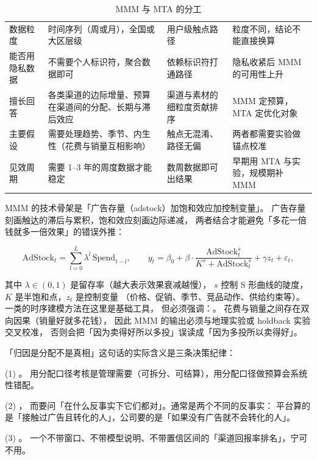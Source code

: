 \begin{table}[htbp]
\centering
\caption{MMM 与 MTA 的分工}
\label{tab:growth-mmm-mta}
\small
\begin{tabularx}{\textwidth}{L{2.1cm} L{3.5cm} L{3.5cm} Y}
\toprule
{} &  &  &  \\
\midrule
数据粒度 & 时间序列（周或月），全国或大区层级 & 用户级触点路径 & 粒度不同，结论不能直接换算 \\
\addlinespace
能否用隐私数据 & 不需要个人标识符，聚合数据即可 & 依赖标识符打通路径 & 隐私收紧后 MMM 的可用性上升 \\
\addlinespace
擅长回答 & 各类渠道的边际增量、预算在渠道间的分配、长期与滞后效应 & 渠道与素材的细粒度贡献排序 & MMM 定预算，MTA 定优化对象 \\
\addlinespace
主要假设 & 需要处理趋势、季节、内生性（花费与销量互相影响） & 触点无混淆、路径无偏 & 两者都需要实验做锚点校准 \\
\addlinespace
见效周期 & 需要 1--3 年的周度数据才能稳定 & 数周数据即可出结果 & 早期用 MTA 与实验，规模期补 MMM \\
\bottomrule
\end{tabularx}
\end{table}

MMM 的技术骨架是「广告存量（adstock）加饱和效应加控制变量」。
广告存量刻画触达的滞后与累积，饱和效应刻画边际递减，
两者结合才能避免「多花一倍钱就多一倍效果」的错误外推：

\begin{equation}
\text{AdStock}_t = \sum_{l=0}^{L} \lambda^{l}\,\text{Spend}_{t-l},
\qquad
y_t = \beta_0 + \beta \cdot \frac{\text{AdStock}_t^{s}}{K^{s} + \text{AdStock}_t^{s}}
+ \gamma z_t + \varepsilon_t ,
\label{eq:growth-adstock}
\end{equation}

其中 $\lambda \in (0,1)$ 是留存率（越大表示效果衰减越慢），
$s$ 控制 S 形曲线的陡度，$K$ 是半饱和点，$z_t$ 是控制变量
（价格、促销、季节、竞品动作、供给约束等）。
\cite{hyndman2021forecasting} 一类的时序建模方法在这里是基础工具，
但必须强调：。
花费与销量之间存在双向因果（销量好就多花钱），
因此 MMM 的输出必须与地理实验或 holdback 实验交叉校准，
否则会把「因为卖得好所以多投」误读成「因为多投所以卖得好」。

\begin{insight}
「归因是分配不是真相」这句话的实际含义是三条决策纪律：

(1) 。
用分配口径考核是管理需要（可拆分、可结算），用分配口径做预算会系统性错配。

(2) ，
而要问「在什么反事实下它们都对」。通常是两个不同的反事实：
平台算的是「接触过广告且转化的人」，公司要的是「如果没有广告就不会转化的人」。

(3) 。
一个不带窗口、不带模型说明、不带置信区间的「渠道回报率排名」，宁可不用。
\end{insight}

